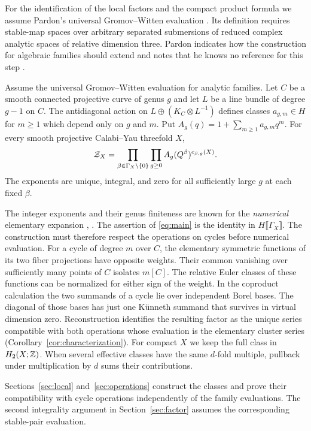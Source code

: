 For the identification of the local factors and the compact product
formula we assume Pardon's universal Gromov--Witten evaluation
\cite[\S\S3.4--3.5]{Pardon}. Its definition requires stable-map spaces
over arbitrary separated submersions of reduced complex analytic
spaces of relative dimension three. Pardon indicates how the
construction for algebraic families should extend and notes that he
knows no reference for this step \cite[Remark~1.8]{Pardon}.

\begin{theorem}\label{thm:main}
Assume the universal Gromov--Witten evaluation for analytic families.
Let $C$ be a smooth connected projective curve of genus $g$ and
let $L$ be a line bundle of degree $g-1$ on $C$.
The antidiagonal action on $L\oplus(K_C\otimes L^{-1})$ defines
classes $a_{g,m}\in H$ for $m\geq 1$ which depend only on $g$ and
$m$. Put $A_g(q)=1+\sum_{m\geq1}a_{g,m}q^m$.
For every smooth projective Calabi--Yau threefold $X$,
\begin{equation}\label{eq:main}
 \mathcal Z_X=\prod_{\beta\in\Gamma_X\setminus\{0\}}\prod_{g\geq0}
             A_g(Q^\beta)^{c_{\beta,g}(X)} .
\end{equation}
The exponents are unique, integral, and zero for all sufficiently
large $g$ at each fixed $\beta$.
\end{theorem}

The integer exponents and their genus finiteness are known for the
\emph{numerical} elementary expansion
\cite[Theorem~8.1]{IP}, \cite[Theorem~3.50]{DIW}. The assertion of
\eqref{eq:main} is the identity in $H\llbracket\Gamma_X\rrbracket$.
The construction must therefore respect the operations on cycles
before numerical evaluation. For a cycle of degree $m$ over $C$,
the elementary symmetric functions of its two fiber projections
have opposite weights. Their common vanishing over sufficiently
many points of $C$ isolates $m[C]$. The relative Euler classes of
these functions can be normalized for either sign of the weight.
In the coproduct calculation the two summands of a cycle lie over
independent Borel bases. The diagonal of those bases has just one
K\"unneth summand that survives in virtual dimension zero.
Reconstruction identifies the resulting factor as the unique series
compatible with both operations whose evaluation is the elementary
cluster series (Corollary~\ref{cor:characterization}). For compact $X$
we keep the full class in $H_2(X;\mathbb Z)$. When several effective classes
have the same $d$-fold multiple, pullback under multiplication by $d$
sums their contributions.

Sections~\ref{sec:local} and~\ref{sec:operations} construct the classes
and prove their compatibility with cycle operations independently of the
family evaluations. The second integrality argument in
Section~\ref{sec:factor} assumes the corresponding stable-pair evaluation.
